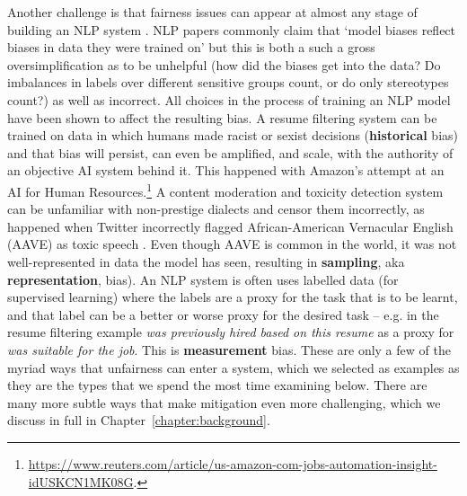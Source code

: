 Another challenge is that fairness issues can appear at almost any stage of building an NLP system \citep{suresh2021framework}. NLP papers commonly claim that `model biases reflect biases in data they were trained on' but this is both a such a gross oversimplification as to be unhelpful (how did the biases get into the data? Do imbalances in labels over different sensitive groups count, or do only stereotypes count?) as well as incorrect. All choices in the process of training an NLP model have been shown to affect the resulting bias. A resume filtering system can be trained on data in which humans made racist or sexist decisions (\textbf{historical} bias) and that bias will persist, can even be amplified, and scale, with the authority of an objective AI system behind it. This happened with Amazon's attempt at an AI for Human Resources.\footnote{ \url{https://www.reuters.com/article/us-amazon-com-jobs-automation-insight-idUSKCN1MK08G}.} A content moderation and toxicity detection system can be unfamiliar with non-prestige dialects and censor them incorrectly, as happened when Twitter incorrectly flagged African-American Vernacular English (AAVE) as toxic speech \citep{sap-etal-2019-risk}. Even though AAVE is common in the world, it was not well-represented in data the model has seen, resulting in \textbf{sampling}, aka \textbf{representation}, bias). An NLP system is often uses labelled data (for supervised learning) where the labels are a proxy for the task that is to be learnt, and that label can be a better or worse proxy for the desired task -- e.g. in the resume filtering example \textit{was previously hired based on this resume} as a proxy for \textit{was suitable for the job}. This is \textbf{measurement} bias. These are only a few of the myriad ways that unfairness can enter a system, which we selected as examples as they are the types that we spend the most time examining below. There are many more subtle ways that make mitigation even more challenging, which we discuss in full in Chapter~\ref{chapter:background}.






